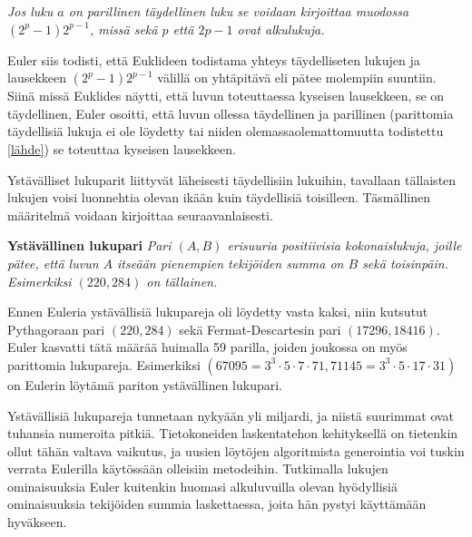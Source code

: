 \documentclass[a4paper,11pt]{article}
\begin{document}
\begin{center}
    \textit{Jos luku $a$ on parillinen täydellinen luku se voidaan kirjoittaa muodossa $(2^p-1)2^{p-1}$, missä sekä $p$ että $2p-1$ ovat alkulukuja.}
\end{center}

Euler siis todisti, että Euklideen todistama yhteys täydelliseten lukujen ja lausekkeen $(2^p-1)2^{p-1}$ välillä on yhtäpitävä eli pätee molempiin suuntiin. Siinä missä Euklides näytti, että luvun toteuttaessa kyseisen lausekkeen, se on täydellinen, Euler osoitti, että luvun ollessa täydellinen ja parillinen (parittomia täydellisiä lukuja ei ole löydetty tai niiden olemassaolemattomuutta todistettu \ref{lähde}) se toteuttaa kyseisen lausekkeen.

Ystävälliset lukuparit liittyvät läheisesti täydellisiin lukuihin, tavallaan tällaisten lukujen voisi luonnehtia olevan ikään kuin täydellisiä toisilleen. Täsmällinen määritelmä voidaan kirjoittaa seuraavanlaisesti.

\begin{center}
    \textbf{Ystävällinen lukupari} \textit{Pari $(A, B)$ erisuuria positiivisia kokonaislukuja, joille pätee, että luvun $A$ itseään pienempien tekijöiden summa on $B$ sekä toisinpäin. \textit{Esimerkiksi} $(220, 284)$ on tällainen.}
\end{center}

Ennen Euleria ystävällisiä lukupareja oli löydetty vasta kaksi, niin kutsutut Pythagoraan pari $(220, 284)$ sekä Fermat-Descartesin pari $(17296, 18416)$. Euler kasvatti tätä määrää huimalla 59 parilla, joiden joukossa on myös parittomia lukupareja. Esimerkiksi $(67095=3^3\cdot5\cdot7\cdot71, 71145=3^3\cdot5\cdot17\cdot31)$ on Eulerin löytämä pariton ystävällinen lukupari.

Ystävällisiä lukupareja tunnetaan nykyään yli miljardi, ja niistä suurimmat ovat tuhansia numeroita pitkiä. Tietokoneiden laskentatehon kehityksellä on tietenkin ollut tähän valtava vaikutus, ja uusien löytöjen algoritmista generointia voi tuskin verrata Eulerilla käytössään olleisiin metodeihin. Tutkimalla lukujen ominaisuuksia Euler kuitenkin huomasi alkuluvuilla olevan hyödyllisiä ominaisuuksia tekijöiden summia laskettaessa, joita hän pystyi käyttämään hyväkseen. \cite{tarvii kaivaa siitä yhdestä exam paperista} %
\end{document}

